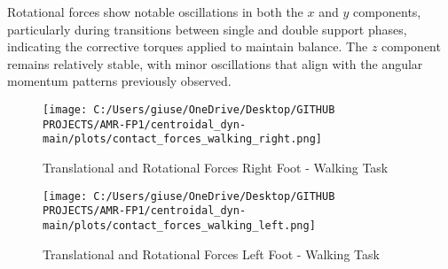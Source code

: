 \documentclass[main.tex]{subfiles}
\begin{document}
\begin{sloppypar}
Rotational forces show notable oscillations in both the $x$ and $y$ components, particularly during transitions between single and double support phases, indicating the corrective torques applied to maintain balance. The $z$ component remains relatively stable, with minor oscillations that align with the angular momentum patterns previously observed.
\begin{figure}[htbp]
    \centering
    \texttt{[image: C:/Users/giuse/OneDrive/Desktop/GITHUB PROJECTS/AMR-FP1/centroidal\_dyn-main/plots/contact\_forces\_walking\_right.png]}
    \caption{Translational and Rotational Forces Right Foot - Walking Task}
    \label{fig:contact_forces_walking_right}
    
    \vspace{1em} %

    \texttt{[image: C:/Users/giuse/OneDrive/Desktop/GITHUB PROJECTS/AMR-FP1/centroidal\_dyn-main/plots/contact\_forces\_walking\_left.png]}
    \caption{Translational and Rotational Forces Left Foot - Walking Task}
    \label{fig:contact_forces_walking_left}
\end{figure}
\end{sloppypar}
\end{document}
